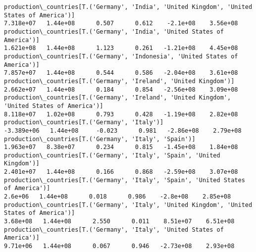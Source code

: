 \documentclass[11pt]{article}
\begin{document}
\begin{Verbatim}[commandchars=\\\{\}]
production\_countries[T.('Germany', 'India', 'United Kingdom', 'United States of America')]                                                                                             7.318e+07   1.44e+08      0.507      0.612    -2.1e+08    3.56e+08
production\_countries[T.('Germany', 'India', 'United States of America')]                                                                                                               1.621e+08   1.44e+08      1.123      0.261   -1.21e+08    4.45e+08
production\_countries[T.('Germany', 'Indonesia', 'United States of America')]                                                                                                           7.857e+07   1.44e+08      0.544      0.586   -2.04e+08    3.61e+08
production\_countries[T.('Germany', 'Ireland', 'United Kingdom')]                                                                                                                       2.662e+07   1.44e+08      0.184      0.854   -2.56e+08    3.09e+08
production\_countries[T.('Germany', 'Ireland', 'United Kingdom', 'United States of America')]                                                                                           8.118e+07   1.02e+08      0.793      0.428   -1.19e+08    2.82e+08
production\_countries[T.('Germany', 'Italy')]                                                                                                                                          -3.389e+06   1.44e+08     -0.023      0.981   -2.86e+08    2.79e+08
production\_countries[T.('Germany', 'Italy', 'Spain')]                                                                                                                                  1.963e+07   8.38e+07      0.234      0.815   -1.45e+08    1.84e+08
production\_countries[T.('Germany', 'Italy', 'Spain', 'United Kingdom')]                                                                                                                2.401e+07   1.44e+08      0.166      0.868   -2.59e+08    3.07e+08
production\_countries[T.('Germany', 'Italy', 'Spain', 'United States of America')]                                                                                                        2.6e+06   1.44e+08      0.018      0.986    -2.8e+08    2.85e+08
production\_countries[T.('Germany', 'Italy', 'United Kingdom', 'United States of America')]                                                                                              3.68e+08   1.44e+08      2.550      0.011    8.51e+07    6.51e+08
production\_countries[T.('Germany', 'Italy', 'United States of America')]                                                                                                                9.71e+06   1.44e+08      0.067      0.946   -2.73e+08    2.93e+08

\end{Verbatim}
\end{document}

